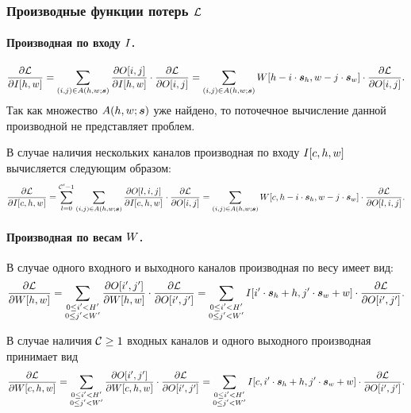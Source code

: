 \documentclass{book}
\numberwithin{theorem}{chapter}
\numberwithin{statement}{chapter}
\numberwithin{lemma}{chapter}
\theoremstyle{definition}
\numberwithin{task}{chapter}
\theoremstyle{remark}
\numberwithin{example}{chapter}
\theoremstyle{definition}
\numberwithin{definition}{chapter}
\theoremstyle{remark}
\theoremstyle{remark}
\numberwithin{lyrics}{section}
\begin{document}
\subsubsection{Производные функции потерь $\mathcal{L}$}
\paragraph{Производная по входу $I$.}
\begin{equation}
\frac{\partial \mathcal{L} }{\partial I[h, w]}= \sum\limits_{(i, j) \in A(h, w; \boldsymbol{s})} 
\frac{\partial O[i, j] }{\partial I[h, w]} \cdot \frac{\partial \mathcal{L} }{\partial O[i, j]} =
\sum\limits_{(i, j) \in A(h, w; \boldsymbol{s})} W[h - i \cdot \boldsymbol{s}_h, w - j \cdot \boldsymbol{s}_w] \cdot \frac{\partial \mathcal{L} }{\partial O[i, j]}.
\end{equation}
Так как множество $A(h, w; \boldsymbol{s})$ уже найдено, то поточечное вычисление данной производной не представляет проблем.

В случае наличия нескольких каналов производная по входу $I[c, h, w]$ вычисляется следующим образом:
\begin{equation}
\frac{\partial \mathcal{L} }{\partial I[c, h, w]}= \sum\limits_{l=0}^{\mathcal{C}' - 1}\sum\limits_{(i, j) \in A(h, w; \boldsymbol{s})} 
\frac{\partial O[l, i, j] }{\partial I[c, h, w]} \cdot \frac{\partial \mathcal{L} }{\partial O[i, j]} =
\sum\limits_{(i, j) \in A(h, w; \boldsymbol{s})} W[c, h - i \cdot \boldsymbol{s}_h, w - j \cdot \boldsymbol{s}_w] \cdot \frac{\partial \mathcal{L} }{\partial O[l, i, j]}.
\end{equation}

\paragraph{Производная по весам $W$.}
В случае одного входного и выходного каналов производная по весу имеет вид:
\begin{equation}
\frac{\partial \mathcal{L} }{\partial W[h, w]} = \sum\limits_{\substack{0 \le i' < H' \\ 0 \le j' < W'}} \frac{\partial O[i', j'] }{\partial W[h, w]} \cdot  \frac{\partial \mathcal{L} }{\partial O[i', j']} =  \sum\limits_{\substack{0 \le i' < H' \\ 0 \le j' < W'}} I[i' \cdot \boldsymbol{s}_h + h, j' \cdot \boldsymbol{s}_w + w] \cdot \frac{\partial \mathcal{L} }{\partial O[i', j']}.
\end{equation}

В случае наличия $\mathcal{C}\ge 1$ входных каналов и одного выходного производная принимает вид
\begin{equation}
\frac{\partial \mathcal{L} }{\partial W[c, h, w]} = \sum\limits_{\substack{0 \le i' < H' \\ 0 \le j' < W'}} \frac{\partial O[i', j'] }{\partial W[c, h, w]} \cdot  \frac{\partial \mathcal{L} }{\partial O[i', j']} =  \sum\limits_{\substack{0 \le i' < H' \\ 0 \le j' < W'}} I[c, i' \cdot \boldsymbol{s}_h + h, j' \cdot \boldsymbol{s}_w + w] \cdot \frac{\partial \mathcal{L} }{\partial O[i', j']}.
\end{equation}
\end{document}
